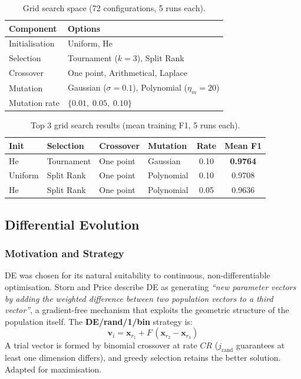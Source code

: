 \documentclass[12pt, a4paper]{article}
\newcommand{\rowhead}{\rowcolor{primary}\color{white}\bfseries}
\begin{document}
\begin{table}[H]
\centering
\renewcommand{\arraystretch}{1.3}
\begin{tabular}{ll}
\toprule
\rowhead Component & \multicolumn{1}{l}{\color{white}Options} \\
\midrule
Initialisation & Uniform, He \\
Selection      & Tournament ($k=3$), Split Rank \\
Crossover      & One point, Arithmetical, Laplace \\
Mutation       & Gaussian ($\sigma=0.1$), Polynomial ($\eta_m=20$) \\
Mutation rate  & $\{0.01,\; 0.05,\; 0.10\}$ \\
\bottomrule
\end{tabular}
\caption{Grid search space (72 configurations, 5 runs each).}
\label{tab:gridsearch_space}
\end{table}

\begin{table}[H]
\centering
\renewcommand{\arraystretch}{1.3}
\begin{tabular}{llllcc}
\toprule
\rowhead Init & \color{white}Selection & \color{white}Crossover & \color{white}Mutation & \color{white}Rate & \color{white}Mean F1 \\
\midrule
He      & Tournament & One point & Gaussian   & 0.10 & \textbf{0.9764} \\
Uniform & Split Rank & One point & Polynomial & 0.10 & 0.9708 \\
He      & Split Rank & One point & Polynomial & 0.05 & 0.9636 \\
\bottomrule
\end{tabular}
\caption{Top 3 grid search results (mean training F1, 5 runs each).}
\label{tab:gridsearch_top}
\end{table}

\subsection{Differential Evolution}

\subsubsection{Motivation and Strategy}
DE \cite{storn1997} was chosen for its natural suitability to continuous, non-differentiable optimisation. Storn and Price describe DE as generating \textit{``new parameter vectors by adding the weighted difference between two population vectors to a third vector''}, a gradient-free mechanism that exploits the geometric structure of the population itself. The \textbf{DE/rand/1/bin} strategy is:
\[
\mathbf{v}_i = \mathbf{x}_{r_1} + F\,(\mathbf{x}_{r_2} - \mathbf{x}_{r_3})
\]
A trial vector is formed by binomial crossover at rate $CR$ ($j_\text{rand}$ guarantees at least one dimension differs), and greedy selection retains the better solution. Adapted for maximisation.
\end{document}
